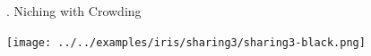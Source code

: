 \documentclass[9pt]{beamer}
\newcommand{\BackgroundImage}[2][0.3] {
  \tikz[remember picture,overlay]
  \node[opacity=#1+0.1, inner sep=0pt] at (current page.center)
       {\texttt{[image: \#2]}};
       \clearpage
}
\begin{document}


\begin{frame}{\theframenumber. Niching with Crowding}
  \begin{center}
  \texttt{[image: ../../examples/iris/sharing3/sharing3-black.png]}
  \end{center}
\end{frame}


\end{document}
